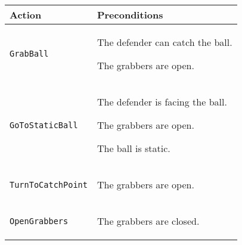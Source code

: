 \begin{center}

\renewcommand{\arraystretch}{1.5}
\begin{tabular}{ | >{\centering\arraybackslash}m{42mm} | >{\centering\arraybackslash}p{110mm} | }
\hline
\textbf{Action} & \textbf{Preconditions} \\ \hline
\texttt{GrabBall} &
\begin{compactitem}
\item The defender can catch the ball.
\item The grabbers are open.
\end{compactitem}  \\ \hline

\texttt{GoToStaticBall} &
\begin{compactitem}
\item The defender is facing the ball.
\item The grabbers are open.
\item The ball is static.
\end{compactitem}  \\ \hline

\texttt{TurnToCatchPoint} &
\begin{compactitem}
\item The grabbers are open.
\end{compactitem}  \\ \hline

\texttt{OpenGrabbers} &
\begin{compactitem}
\item The grabbers are closed.
\end{compactitem}  \\ \hline

\end{tabular}
\par
\bigskip

\end{center}
